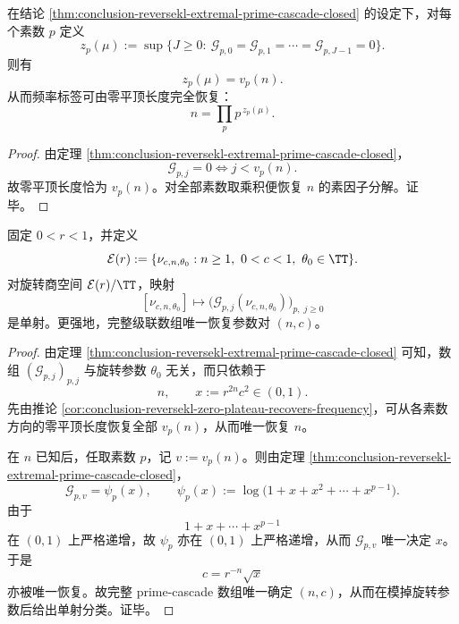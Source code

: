 \begin{corollary}[零平顶长度恢复频率的素因子指数]\label{cor:conclusion-reversekl-zero-plateau-recovers-frequency}
在结论 \ref{thm:conclusion-reversekl-extremal-prime-cascade-closed} 的设定下，对每个素数 \(p\) 定义
\[
z_p(\mu):=
\sup\{J\ge 0:\ \mathcal G_{p,0}=\mathcal G_{p,1}=\cdots=\mathcal G_{p,J-1}=0\}.
\]
则有
\[
z_p(\mu)=v_p(n).
\]
从而频率标签可由零平顶长度完全恢复：
\[
n=\prod_{p}p^{\,z_p(\mu)}.
\]
\end{corollary}
\begin{proof}
由定理 \ref{thm:conclusion-reversekl-extremal-prime-cascade-closed}，
\[
\mathcal G_{p,j}=0\iff j<v_p(n).
\]
故零平顶长度恰为 \(v_p(n)\)。对全部素数取乘积便恢复 \(n\) 的素因子分解。证毕。
\end{proof}

\begin{theorem}\label{thm:conclusion-reversekl-full-prime-cascade-classification}
固定 \(0<r<1\)，并定义
\[
\mathcal E(r):=\{\nu_{c,n,\theta_0}:n\ge 1,\ 0<c<1,\ \theta_0\in\TT\}.
\]
对旋转商空间 \(\mathcal E(r)/\TT\)，映射
\[
[\nu_{c,n,\theta_0}]
\longmapsto
\bigl(\mathcal G_{p,j}(\nu_{c,n,\theta_0})\bigr)_{p,\;j\ge 0}
\]
是单射。更强地，完整级联数组唯一恢复参数对 \((n,c)\)。
\end{theorem}
\begin{proof}
由定理 \ref{thm:conclusion-reversekl-extremal-prime-cascade-closed} 可知，数组 \((\mathcal G_{p,j})_{p,j}\) 与旋转参数 \(\theta_0\) 无关，而只依赖于
\[
n,\qquad x:=r^{2n}c^2\in(0,1).
\]
先由推论 \ref{cor:conclusion-reversekl-zero-plateau-recovers-frequency}，可从各素数方向的零平顶长度恢复全部 \(v_p(n)\)，从而唯一恢复 \(n\)。

在 \(n\) 已知后，任取素数 \(p\)，记 \(v:=v_p(n)\)。则由定理 \ref{thm:conclusion-reversekl-extremal-prime-cascade-closed}，
\[
\mathcal G_{p,v}=\psi_p(x),
\qquad
\psi_p(x):=\log\!\bigl(1+x+x^2+\cdots+x^{p-1}\bigr).
\]
由于
\[
1+x+\cdots+x^{p-1}
\]
在 \((0,1)\) 上严格递增，故 \(\psi_p\) 亦在 \((0,1)\) 上严格递增，从而 \(\mathcal G_{p,v}\) 唯一决定 \(x\)。
于是
\[
c=r^{-n}\sqrt{x}
\]
亦被唯一恢复。故完整 prime-cascade 数组唯一确定 \((n,c)\)，从而在模掉旋转参数后给出单射分类。证毕。
\end{proof}

